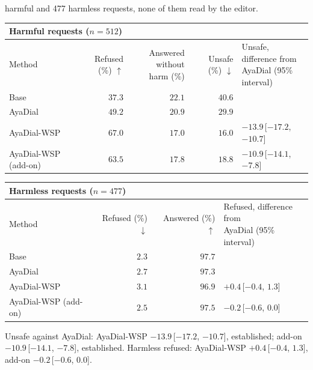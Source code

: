\documentclass[10pt,a4paper]{article}
\renewcommand{\arraystretch}{1.12}
\begin{document}
\vspace{-3pt} harmful and 477 harmless requests, none of them read by the editor.

\begin{table}[H]\centering\small\renewcommand{\arraystretch}{1.25}\begin{tabular}{|l|r|r|r|l|}\hline
\multicolumn{5}{|l|}{\textbf{Harmful requests ($n = 512$)}}\\\hline
Method & Refused (\%) $\uparrow$ & \makecell[r]{Answered without\\harm (\%)} & Unsafe (\%) $\downarrow$ & \makecell[l]{Unsafe, difference from\\AyaDial (95\% interval)}\\\hline
Base & $37.3$ & $22.1$ & $40.6$ & \\\hline
AyaDial & $49.2$ & $20.9$ & $29.9$ & \\\hline
AyaDial-WSP & \cellcolor{win}$\mathbf{67.0}$ & $17.0$ & \cellcolor{win}$\mathbf{16.0}$ & $-13.9$\,[$-17.2$, $-10.7$]\\\hline
AyaDial-WSP (add-on) & $63.5$ & $17.8$ & $18.8$ & $-10.9$\,[$-14.1$, $-7.8$]\\\hline
\end{tabular}\end{table}
\begin{table}[H]\centering\small\renewcommand{\arraystretch}{1.25}\begin{tabular}{|l|r|r|l|}\hline
\multicolumn{4}{|l|}{\textbf{Harmless requests ($n = 477$)}}\\\hline
Method & Refused (\%) $\downarrow$ & Answered (\%) $\uparrow$ & \makecell[l]{Refused, difference from\\AyaDial (95\% interval)}\\\hline
Base & $2.3$ & $97.7$ & \\\hline
AyaDial & $2.7$ & $97.3$ & \\\hline
AyaDial-WSP & $3.1$ & $96.9$ & $+0.4$\,[$-0.4$, $1.3$]\\\hline
AyaDial-WSP (add-on) & $2.5$ & $97.5$ & $-0.2$\,[$-0.6$, $0.0$]\\\hline
\end{tabular}\end{table}
Unsafe against AyaDial: AyaDial-WSP $-13.9$\,[$-17.2$, $-10.7$], established; add-on $-10.9$\,[$-14.1$, $-7.8$], established. Harmless refused: AyaDial-WSP $+0.4$\,[$-0.4$, $1.3$], add-on $-0.2$\,[$-0.6$, $0.0$].
\end{document}

